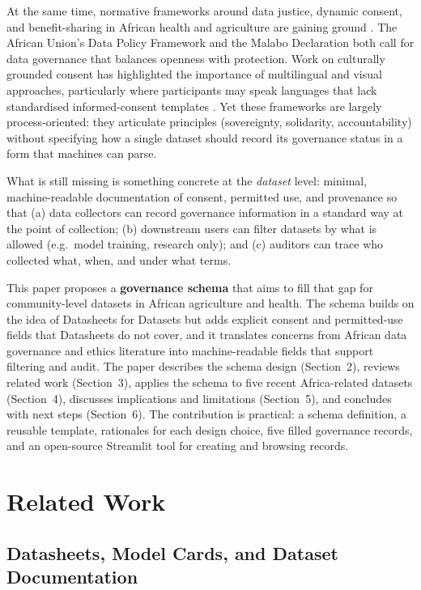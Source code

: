 \documentclass{article}
\begin{document}
At the same time, normative frameworks around data justice, dynamic consent, and benefit-sharing in African health and agriculture are gaining ground \cite{munung2025,barrett2025}. The African Union's Data Policy Framework and the Malabo Declaration both call for data governance that balances openness with protection. Work on culturally grounded consent has highlighted the importance of multilingual and visual approaches, particularly where participants may speak languages that lack standardised informed-consent templates \cite{omutoko2024}. Yet these frameworks are largely process-oriented: they articulate principles (sovereignty, solidarity, accountability) without specifying how a single dataset should record its governance status in a form that machines can parse.

What is still missing is something concrete at the \emph{dataset} level: minimal, machine-readable documentation of consent, permitted use, and provenance so that (a) data collectors can record governance information in a standard way at the point of collection; (b) downstream users can filter datasets by what is allowed (e.g.\ model training, research only); and (c) auditors can trace who collected what, when, and under what terms.

This paper proposes a \textbf{governance schema} that aims to fill that gap for community-level datasets in African agriculture and health. The schema builds on the idea of Datasheets for Datasets \cite{gebru2021} but adds explicit consent and permitted-use fields that Datasheets do not cover, and it translates concerns from African data governance and ethics literature \cite{munung2025,omutoko2024,brown2024} into machine-readable fields that support filtering and audit. The paper describes the schema design (Section~2), reviews related work (Section~3), applies the schema to five recent Africa-related datasets (Section~4), discusses implications and limitations (Section~5), and concludes with next steps (Section~6). The contribution is practical: a schema definition, a reusable template, rationales for each design choice, five filled governance records, and an open-source Streamlit tool for creating and browsing records.

\section{Related Work}

\subsection{Datasheets, Model Cards, and Dataset Documentation}
\end{document}
